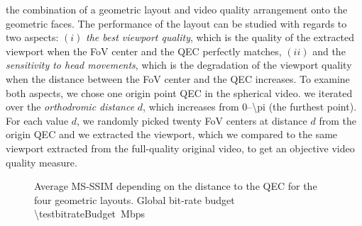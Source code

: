  the
combination of a geometric layout and video quality arrangement onto
the geometric faces. The performance of the layout can be studied with
regards to two aspects: $(i)$ \emph{the best viewport quality}, which
is the quality of the extracted viewport when the \ac{FoV} center and
the \ac{QEC} perfectly matches, $(ii)$ and the \emph{sensitivity to
head movements}, which is the degradation of the viewport quality when
the distance between the FoV center and the \ac{QEC} increases. To
examine both aspects, we chose one origin point \ac{QEC} in the
spherical video.  we iterated over the \emph{orthodromic
distance} $d$, which increases from \numrange{0}{\pi} (the furthest
point). For each value $d$, we randomly picked twenty \ac{FoV} centers
at distance $d$ from the origin \ac{QEC} and we extracted the
viewport, which we compared to the same viewport extracted from the
full-quality original video, to get an objective video quality
measure.

\begin{figure}
    
       \caption{Average \acs{MS-SSIM} depending on the distance to the \acs{QEC} for the four geometric layouts. Global bit-rate budget \SI{\testbitrateBudget}{\mega bps}}
    \label{fig:dist_quality}
\end{figure}


